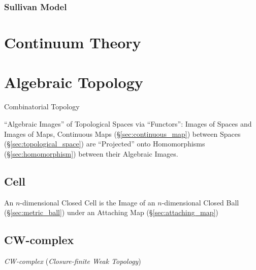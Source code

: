 \subsubsection{Sullivan Model}\label{sec:sullivan_model}



\section{Continuum Theory}\label{sec:continuum_theory}

\section{Algebraic Topology}\label{sec:algebraic_topology}

Combinatorial Topology

``Algebraic Images'' of Topological Spaces via ``Functors'': Images of
Spaces and Images of Maps, Continuous Maps
(\S\ref{sec:continuous_map}) between Spaces
(\S\ref{sec:topological_space}) are ``Projected'' onto Homomorphisms
(\S\ref{sec:homomorphism}) between their Algebraic
Images.\cite{hatcher02}



\subsection{Cell}\label{sec:topology_cell}

An $n$-dimensional Closed Cell is the Image of an $n$-dimensional
Closed Ball (\S\ref{sec:metric_ball}) under an Attaching Map
(\S\ref{sec:attaching_map})



\subsection{CW-complex}\label{sec:cw_complex}

\emph{CW-complex} (\emph{Closure-finite Weak Topology})

